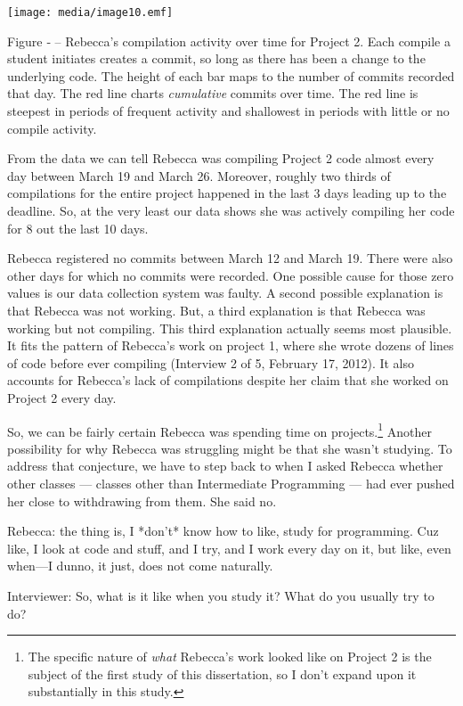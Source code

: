 \texttt{[image: media/image10.emf]}

\protect\hypertarget{ux5fToc252445971}{}{}Figure ‑ -- Rebecca's
compilation activity over time for Project 2. Each compile a student
initiates creates a commit, so long as there has been a change to the
underlying code. The height of each bar maps to the number of commits
recorded that day. The red line charts \emph{cumulative} commits over
time. The red line is steepest in periods of frequent activity and
shallowest in periods with little or no compile activity.

From the data we can tell Rebecca was compiling Project 2 code almost
every day between March 19 and March 26. Moreover, roughly two thirds of
compilations for the entire project happened in the last 3 days leading
up to the deadline. So, at the very least our data shows she was
actively compiling her code for 8 out the last 10 days.

Rebecca registered no commits between March 12 and March 19. There were
also other days for which no commits were recorded. One possible cause
for those zero values is our data collection system was faulty. A second
possible explanation is that Rebecca was not working. But, a third
explanation is that Rebecca was working but not compiling. This third
explanation actually seems most plausible. It fits the pattern of
Rebecca's work on project 1, where she wrote dozens of lines of code
before ever compiling (Interview 2 of 5, February 17, 2012). It also
accounts for Rebecca's lack of compilations despite her claim that she
worked on Project 2 every day.

So, we can be fairly certain Rebecca was spending time on
projects.\footnote{The specific nature of \emph{what} Rebecca's work
  looked like on Project 2 is the subject of the first study of this
  dissertation, so I don't expand upon it substantially in this study.}
Another possibility for why Rebecca was struggling might be that she
wasn't studying. To address that conjecture, we have to step back to
when I asked Rebecca whether other classes --- classes other than
Intermediate Programming --- had ever pushed her close to withdrawing
from them. She said no.

Rebecca: the thing is, I *don't* know how to like, study for
programming. Cuz like, I look at code and stuff, and I try, and I work
every day on it, but like, even when---I dunno, it just, does not come
naturally.

Interviewer: So, what is it like when you study it? What do you usually
try to do?

